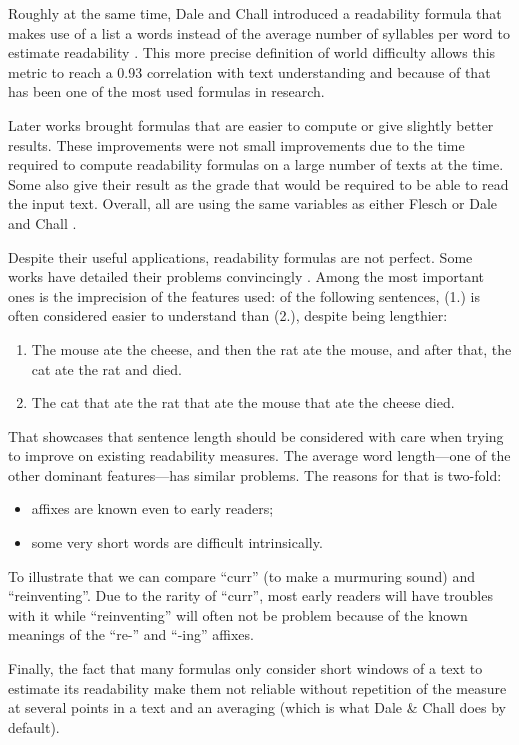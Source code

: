 \documentclass[a4paper, 11pt, onepage]{scrreprt}
\begin{document}
Roughly at the same time, Dale and Chall introduced a readability
formula that makes use of a list a words instead of the average number
of syllables per word to estimate readability
\cite{dale1948formula}. This more precise definition of world
difficulty allows this metric to reach a 0.93 correlation with text
understanding and because of that has been one of the most used
formulas in research.

Later works brought formulas that are easier to compute or give
slightly better results. These improvements were not small
improvements due to the time required to compute readability formulas
on a large number of texts at the time. Some also give their result as
the grade that would be required to be able to read the input
text. Overall, all are using the same variables as either Flesch or
Dale and Chall \cite{mclaughlin1969smog, kincaid1975derivation,
  chall1995readability}.

Despite their useful applications, readability formulas are not
perfect. Some works have detailed their problems convincingly
\cite{duffy1985readability, schriver2000readability}. Among the most
important ones is the imprecision of the features used: of the
following sentences, (1.)  is often considered easier to understand
than (2.), despite being lengthier:
\begin{enumerate}
\item The mouse ate the cheese, and then the rat ate the mouse, and
  after that, the cat ate the rat and died.
\item The cat that ate the rat that ate the mouse that ate the cheese
  died.
\end{enumerate}
That showcases that sentence length should be considered with care
when trying to improve on existing readability measures. The average
word length—one of the other dominant features—has similar
problems. The reasons for that is two-fold:
\begin{itemize}
\item affixes are known even to early readers;
\item some very short words are difficult intrinsically.
\end{itemize}
To illustrate that we can compare “curr” (to make a murmuring sound)
and “reinventing”. Due to the rarity of “curr”, most early readers
will have troubles with it while “reinventing” will often not be
problem because of the known meanings of the “re-” and “-ing” affixes.

Finally, the fact that many formulas only consider short windows of a
text to estimate its readability make them not reliable without
repetition of the measure at several points in a text and an averaging
(which is what Dale \& Chall does by default).
\end{document}

